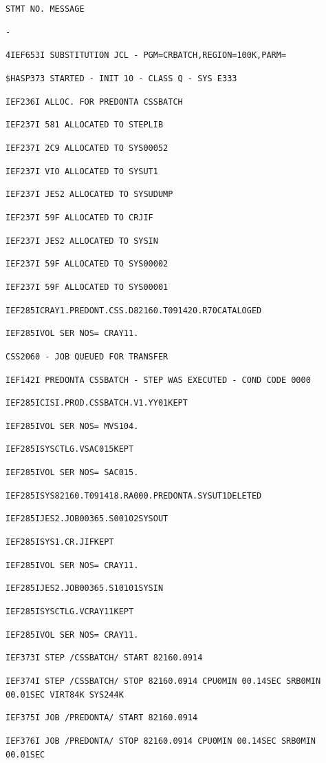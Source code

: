 
\texttt{STMT NO. MESSAGE}

\texttt{-}

\texttt{4\quad IEF653I SUBSTITUTION JCL - PGM=CRBATCH,REGION=100K,PARM=}

\texttt{\$HASP373 STARTED - INIT 10 - CLASS Q - SYS E333}

\texttt{IEF236I ALLOC. FOR PREDONTA CSSBATCH}

\texttt{IEF237I 581 ALLOCATED TO STEPLIB}

\texttt{IEF237I 2C9 ALLOCATED TO SYS00052}

\texttt{IEF237I VIO ALLOCATED TO SYSUT1}

\texttt{IEF237I JES2 ALLOCATED TO SYSUDUMP}

\texttt{IEF237I 59F ALLOCATED TO CRJIF}

\texttt{IEF237I JES2 ALLOCATED TO SYSIN}

\texttt{IEF237I 59F ALLOCATED TO SYS00002}

\texttt{IEF237I 59F ALLOCATED TO SYS00001}

\texttt{IEF285I\quad CRAY1.PREDONT.CSS.D82160.T091420.R70\quad CATALOGED}

\texttt{IEF285I\quad VOL SER NOS= CRAY11.}

\texttt{CSS2060 - JOB QUEUED FOR TRANSFER}

\texttt{IEF142I PREDONTA CSSBATCH - STEP WAS EXECUTED - COND CODE 0000}

\texttt{IEF285I\quad CISI.PROD.CSSBATCH.V1.YY01\quad KEPT}

\texttt{IEF285I\quad VOL SER NOS= MVS104.}

\texttt{IEF285I\quad SYSCTLG.VSAC015\quad KEPT}

\texttt{IEF285I\quad VOL SER NOS= SAC015.}

\texttt{IEF285I\quad SYS82160.T091418.RA000.PREDONTA.SYSUT1\quad DELETED}

\texttt{IEF285I\quad JES2.JOB00365.S00102\quad SYSOUT}

\texttt{IEF285I\quad SYS1.CR.JIF\quad KEPT}

\texttt{IEF285I\quad VOL SER NOS= CRAY11.}

\texttt{IEF285I\quad JES2.JOB00365.S10101\quad SYSIN}

\texttt{IEF285I\quad SYSCTLG.VCRAY11\quad KEPT}

\texttt{IEF285I\quad VOL SER NOS= CRAY11.}

\texttt{IEF373I STEP /CSSBATCH/ START 82160.0914}

\texttt{IEF374I STEP /CSSBATCH/ STOP 82160.0914 CPU\quad 0MIN 00.14SEC SRB\quad 0MIN 00.01SEC VIRT\quad 84K SYS\quad 244K}

\texttt{IEF375I JOB /PREDONTA/ START 82160.0914}

\texttt{IEF376I JOB /PREDONTA/ STOP 82160.0914 CPU\quad 0MIN 00.14SEC SRB\quad 0MIN 00.01SEC}

